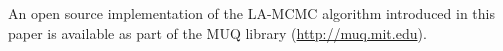 


An open source implementation of the LA-MCMC algorithm introduced in this paper is available as part of the MUQ library (\url{http://muq.mit.edu}).
